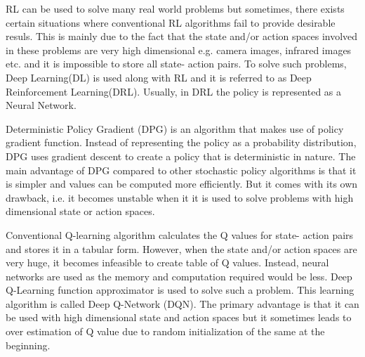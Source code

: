 RL can be used to solve many real world problems but sometimes, there exists certain situations where conventional RL algorithms fail to provide desirable resuls. This is mainly due to the fact that the state and/or action spaces involved in these problems are very high dimensional e.g. camera images, infrared images etc. and it is impossible to store all state- action pairs. To solve such problems, Deep Learning(DL) is used along with RL and it is referred to as Deep Reinforcement Learning(DRL). Usually, in DRL the policy is represented as a Neural Network. 

Deterministic Policy Gradient (DPG) is an algorithm that makes use of policy gradient function. Instead of representing the policy as a probability distribution, DPG uses gradient descent to create a policy that is deterministic in nature. The main advantage of DPG compared to other stochastic policy algorithms is that it is simpler and values can be computed more efficiently. But it comes with its own drawback, i.e. it becomes unstable when it it is used to solve problems with high dimensional state or action spaces. 

Conventional Q-learning algorithm calculates the Q values for state- action pairs and stores it in a tabular form. However, when the state and/or action spaces are very huge, it becomes infeasible to create table of Q values. Instead, neural networks are used as the memory and computation required would be less. Deep Q-Learning function approximator is used to solve such a problem. This learning algorithm is called Deep Q-Network (DQN). The primary advantage is that it can be used with high dimensional state and action spaces but it sometimes leads to over estimation of Q value due to random initialization of the same at the beginning. 





%
%
%
%
%
%
%
%
